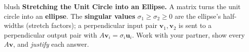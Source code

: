 \documentclass[10pt]{article}
\newcommand{\uu}{\mathbf{u}}
\newcommand{\vv}{\mathbf{v}}
\begin{document}
\namepartnerperiod

\vspace{0.10in}

\begin{headlinebox}{blush}
\small\textbf{Stretching the Unit Circle into an Ellipse.} A matrix turns the unit circle into an
\textbf{ellipse}. The \textbf{singular values} $\sigma_1\ge\sigma_2\ge0$ are the ellipse's half-widths
(stretch factors); a perpendicular input pair $\vv_1,\vv_2$ is sent to a perpendicular output pair with
$A\vv_i=\sigma_i\uu_i$. Work with your partner, show every $A\vv$, and \emph{justify} each answer.
\end{headlinebox}

\vspace{0.10in}
\end{document}
